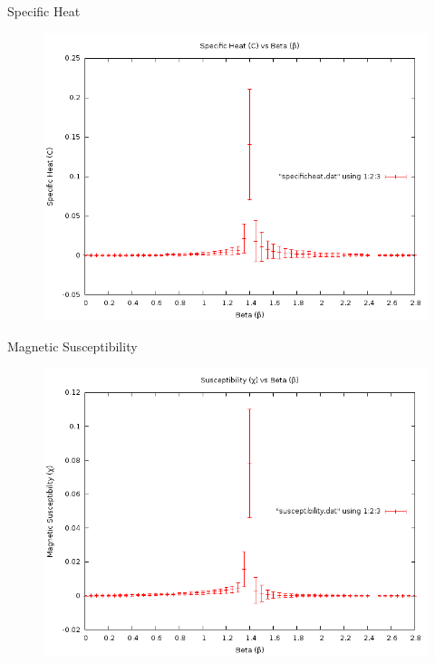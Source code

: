 \documentclass[12pt]{beamer}
\begin{document}
\begin{frame}{Specific Heat}
\begin{figure}
\centering
\includegraphics[width=\textwidth]{Q10SpecificHeatBeta16x16RangeofBeta.png}
\end{figure}
\end{frame}

\begin{frame}{Magnetic Susceptibility}
\begin{figure}
\centering
\includegraphics[width=\textwidth]{Q10SusceptibilityBeta16x16RangeofBeta.png}
\end{figure}
\end{frame}
\end{document}
